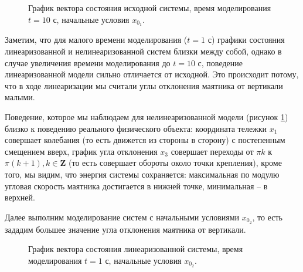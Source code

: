\begin{figure}[!h]
\caption{График вектора состояния исходной системы, время моделирования $t=10$ с, начальные условия $x_{0_1}$.}
\label{2_x_nlin_01_lg}
\end{figure}

Заметим, что для малого времени моделирования ($t=1$ с) графики состояния линеаризованной и нелинеаризованной систем близки между собой, однако в случае увеличения времени моделирования до $t=10$ с, поведение линеаризованной модели сильно отличается от исходной. Это происходит потому, что в ходе линеаризации мы считали углы отклонения маятника от вертикали малыми. 

Поведение, которое мы наблюдаем для нелинеаризованной модели (рисунок \ref{2_x_nlin_01_lg}) близко к поведению реального физического объекта: координата тележки $x_1$ совершает колебания (то есть движется из стороны в сторону) с постепенным смещением вверх, график угла отклонения $x_3$ совершает переходы от $\pi k$ к $\pi(k+1), k \in \mathbf{Z}$ (то есть совершает обороты около точки крепления), кроме того, мы видим, что энергия системы сохраняется: максимальная по модулю угловая скорость маятника достигается в нижней точке, минимальная -- в верхней.


Далее выполним моделирование систем с начальными условиями $x_{0_2}$, то есть зададим  большее значение угла отклонения маятника от вертикали.
\begin{figure}[!h]
\caption{График вектора состояния линеаризованной системы, время моделирования $t=1$ с, начальные условия $x_{0_2}$.}
\label{2_x_lin_02_sm}
\end{figure}

